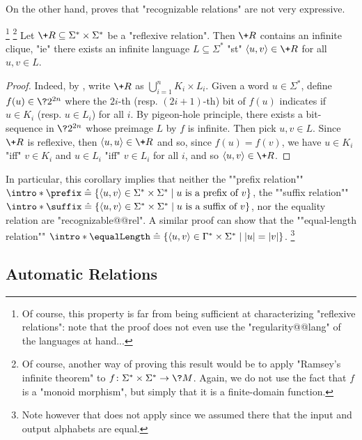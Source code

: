 On the other hand,  proves that "recognizable relations" are not very expressive.
\begin{corollary}
	\!\footnote{Of course, this property is far from being sufficient
	at characterizing "reflexive relations": note that the proof
	does not even use the "regularity@@lang" of the languages at hand...}%
	\footnote{Of course, another way of proving this result would be
	to apply "Ramsey's infinite theorem" to $f\colon \Sigma^* \times \Sigma^* \to \?M$.
	Again, we do not use the fact that $f$ is a "monoid morphism", but simply
	that it is a finite-domain function.}
	\AP\label{coro:infinite-clique-recognizable}
	Let $\+R \subseteq \Sigma^* \times \Sigma^*$ be a "reflexive relation".
	Then $\+R$ contains an infinite clique, "ie"
	there exists an infinite language $L \subseteq \Sigma^*$ "st"
	$\tup{u,v} \in \+R$ for all $u,v \in L$.
\end{corollary}
\begin{proof}
	Indeed, by , write $\+R$ as $\bigcup_{i=1}^n K_i \times L_i$.
	Given a word $u \in \Sigma^*$, define $f(u) \in \?2^{2n}$ where
	the $2i$-th (resp. $(2i+1)$-th) bit of $f(u)$ indicates if $u \in K_i$ (resp. $u \in L_i$)
	for all $i$.
	By pigeon-hole principle, there exists a bit-sequence in $\?2^{2n}$ whose preimage
	$L$ by $f$ is infinite. Then pick $u,v \in L$. Since $\+R$ is reflexive, then
	$\tup{u,u} \in \+R$ and so, since $f(u) = f(v)$, we
	have $u \in K_i$ "iff" $v \in K_i$ and
	$u \in L_i$ "iff" $v \in L_i$ for all $i$, and so $\tup{u,v} \in \+R$.
\end{proof}

In particular, this corollary implies that neither the \AP""prefix relation""
${\intro*\prefix} \defeq \{
	\tup{u,v} \in \Sigma^*\times\Sigma^* \mid
	\text{$u$ is a prefix of $v$}
\}$, the \AP""suffix relation""
${\intro*\suffix} \defeq \{
	\tup{u,v} \in \Sigma^*\times\Sigma^* \mid
	\text{$u$ is a suffix of $v$}
\}$, nor the equality relation are "recognizable@@rel".
A similar proof can show that the ""equal-length relation""
${\intro*\equalLength} \defeq \{
	\tup{u,v} \in \Gamma^*\times\Sigma^* \mid
	|u| = |v|
\}$.%
\footnote{Note however that  does not apply since
we assumed there that the input and output alphabets are equal.}

\subsection{Automatic Relations}

